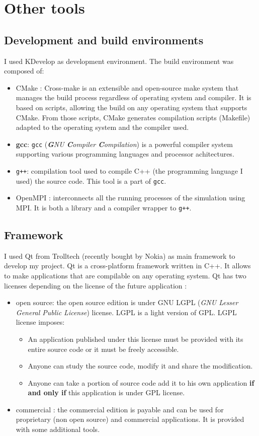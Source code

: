 \section{Other tools}

\subsection{Development and build environments}

I used KDevelop as development environment. The build environment was composed
of: 
\begin{itemize}
 \item CMake : Cross-make is an extensible and open-source make system
that manages the build process regardless of operating system and compiler. It
is based on scripts, allowing the build on any operating system that supports
CMake. From those scripts, CMake generates compilation scripts (Makefile)
adapted to the operating system and the compiler used.
 \item \textbf{gcc}: \texttt{gcc} (\textit{\textbf{G}NU \textbf{C}ompiler
\textbf{C}ompilation}) is a powerful compiler system supporting various
programming languages and processor achitectures. 
 \item \texttt{g++}: compilation tool used to compile C++ (the programming
language I used) the source code. This tool is a part of \texttt{gcc}.
 \item OpenMPI : interconnects all the running processes of the simulation
using MPI. It is both a library and a compiler wrapper to \texttt{g++}.
\end{itemize}

\subsection{Framework}

I used Qt from Trolltech (recently bought by Nokia) as main framework to develop
my project. Qt is a cross-platform framework written in C++. It allows to make
applications that are compilable on any operating system. Qt has two licenses
depending on the license of the future application :
\begin{itemize}
 \item open source: the open source edition is under GNU LGPL (\textit{GNU
Lesser General Public License}) license. LGPL is a light version of GPL. LGPL
license imposes: 
\begin{itemize}
 \item An application published under this license must be provided with its
entire source code or it must be freely accessible.
 \item Anyone can study the source code, modify it and share the modification. 
 \item Anyone can take a portion of source code add it to his own application
\textbf{if and only if} this application is under GPL license. 
\end{itemize}
 \item commercial : the commercial edition is payable and can be used for
proprietary (non open source) and commercial applications. It is provided with
some additional tools.
\end{itemize}

